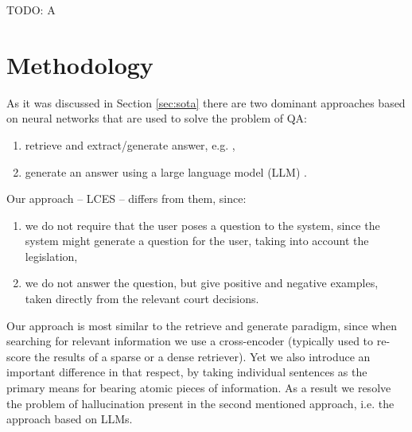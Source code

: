 \documentclass{IOS-Book-Article}
\begin{document}
TODO: A

\section{Methodology}

As it was discussed in Section \ref{sec:sota} there are two dominant approaches 
based on neural networks that are used to solve the problem of QA:
\begin{enumerate}
  \item retrieve and extract/generate answer, e.g. \cite{}, %
  \item generate an answer using a large language model (LLM) \cite{}. %
\end{enumerate}
Our approach -- LCES -- differs from them, since:
\begin{enumerate}
  \item we do not require that the user poses a question to the system, since the system might generate a question for the user,
    taking into account the legislation,
  \item we do not answer the question, but give positive and negative examples, taken directly from the relevant court decisions.
\end{enumerate}
Our approach is most similar to the retrieve and generate paradigm, since when searching for relevant information we use
a cross-encoder (typically used to re-score the results of a sparse or a dense retriever). Yet we also introduce an important
difference in that respect, by taking individual sentences as the primary means for bearing atomic pieces of information.  
As a result we resolve the problem of hallucination present in the second mentioned approach, i.e. the approach based on LLMs.
\end{document}
